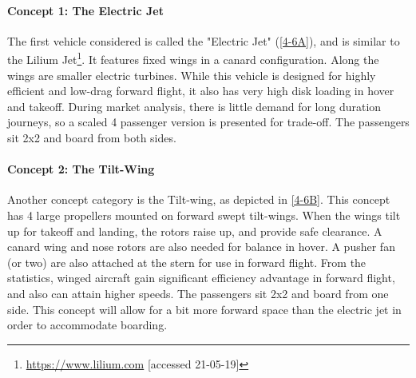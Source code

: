 \paragraph{Concept 1: The Electric Jet}
The first vehicle considered is called the "Electric Jet" (\autoref{4-6A}), and is similar to the Lilium Jet\footnote{\url{https://www.lilium.com} [accessed 21-05-19]}. It features fixed wings in a canard configuration. Along the wings are smaller electric turbines. While this vehicle is designed for highly efficient and low-drag forward flight, it also has very high disk loading in hover and takeoff. During market analysis, there is little demand for long duration journeys, so a scaled 4 passenger version is presented for trade-off. The passengers sit 2x2 and board from both sides.

\paragraph{Concept 2: The Tilt-Wing}
Another concept category is the Tilt-wing, as depicted in \autoref{4-6B}. This concept has 4 large propellers mounted on forward swept tilt-wings. When the wings tilt up for takeoff and landing, the rotors raise up, and provide safe clearance. A canard wing and nose rotors are also needed for balance in hover. A pusher fan (or two) are also attached at the stern for use in forward flight. From the statistics, winged aircraft gain significant efficiency advantage in forward flight, and also can attain higher speeds. The passengers sit 2x2 and board from one side. This concept will allow for a bit more forward space than the electric jet in order to accommodate boarding.

